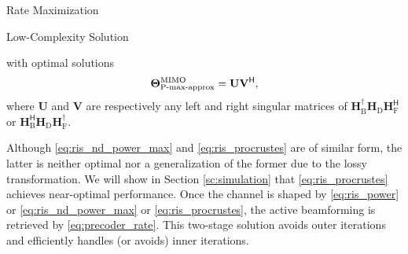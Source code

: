 \documentclass[journal]{IEEEtran}
\begin{document}
\begin{section}{Rate Maximization}
\begin{subsection}{Low-Complexity Solution}
\begin{itemize}
\begin{mini!}
			\end{mini!}
			with optimal solutions \cite[(6.4.1)]{Golub2013}
			\begin{equation}
				\label{eq:ris_procrustes}
				\mathbf{\Theta}_\textnormal{P-max-approx}^\textnormal{MIMO} = \mathbf{U} \mathbf{V}^\mathsf{H},
			\end{equation}
			where $\mathbf{U}$ and $\mathbf{V}$ are respectively any left and right singular matrices of $\mathbf{H}_\mathrm{B}^\dagger \mathbf{H}_\mathrm{D} \mathbf{H}_\mathrm{F}^\mathsf{H}$ or $\mathbf{H}_\mathrm{B}^\mathsf{H} \mathbf{H}_\mathrm{D} \mathbf{H}_\mathrm{F}^\dagger$.
		\end{itemize}

		Although \eqref{eq:ris_nd_power_max} and \eqref{eq:ris_procrustes} are of similar form, the latter is neither optimal nor a generalization of the former due to the lossy transformation.
		We will show in Section \ref{sc:simulation} that \eqref{eq:ris_procrustes} achieves near-optimal performance.
		Once the channel is shaped by \eqref{eq:ris_power} or \eqref{eq:ris_nd_power_max} or \eqref{eq:ris_procrustes}, the active beamforming is retrieved by \eqref{eq:precoder_rate}.
		This two-stage solution avoids outer iterations and efficiently handles (or avoids) inner iterations.
	\end{subsection}



\end{section}
\end{document}
